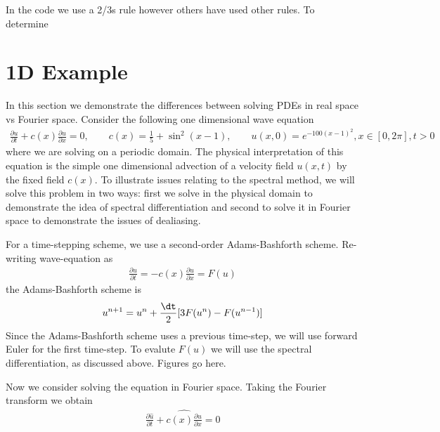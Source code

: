 In the code we use a 2/3s rule however others have used other rules. To determine 

\section{1D Example} 
In this section we demonstrate the differences between solving PDEs in real space vs Fourier space. Consider the following one dimensional wave equation\cite{trefethen_spectral}
\begin{align}
\frac{\partial u}{\partial t} + c(x)\frac{\partial u}{\partial x} = 0,\qquad c(x)=\frac{1}{5}+\sin^{2}(x-1), \qquad u(x,0)=e^{-100(x-1)^{2}}, x\in[0,2\pi], t>0
\end{align}
where we are solving on a periodic domain. The physical interpretation of this equation is the simple one dimensional advection of a velocity field $u(x,t)$ by the fixed field $c(x)$. To illustrate issues relating to the spectral method, we will solve this problem in two ways: first we solve in the physical domain to demonstrate the idea of spectral differentiation and second to solve it in Fourier space to demonstrate the issues of dealiasing.

For a time-stepping scheme, we use a second-order Adams-Bashforth\cite{durran} scheme. Re-writing wave-equation as
\begin{align}
\frac{\partial u}{\partial t} = -c(x)\frac{\partial u}{\partial x} = F(u)
\end{align}
the Adams-Bashforth scheme is
\begin{align}
u^{n+1} = u^{n} + \frac{\dt}{2}[3F(u^{n})-F(u^{n-1})]
\end{align}
Since the Adams-Bashforth scheme uses a previous time-step, we will use forward Euler for the first time-step. To evalute $F(u)$ we will use the spectral differentiation, as discussed above. 
Figures go here.

Now we consider solving the equation in Fourier space. Taking the Fourier transform we obtain
\begin{align}
\frac{\partial \hat{u}}{\partial t} + \widehat{c(x)\frac{\partial u}{\partial x}}=0
\end{align}

